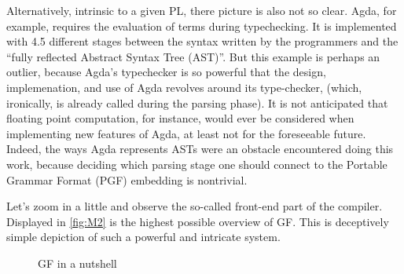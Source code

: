 Alternatively, intrinsic to a given PL, there picture is also not so clear.
Agda, for example, requires the evaluation of terms during typechecking. It is
implemented with 4.5 different stages between the syntax written by the
programmers and the ``fully reflected Abstract Syntax Tree (AST)''. But this
example is perhaps an outlier, because Agda's typechecker is so powerful that
the design, implemenation, and use of Agda revolves around its type-checker,
(which, ironically, is already called during the parsing phase). It is not
anticipated that floating point computation, for instance, would ever be
considered when implementing new features of Agda, at least not for the
foreseeable future. Indeed, the ways Agda represents ASTs were an obstacle
encountered doing this work, because deciding which parsing stage one should connect
to the Portable Grammar Format (PGF) embedding is nontrivial.



Let's zoom in a little and observe the so-called front-end part of the compiler.
Displayed in \autoref{fig:M2} is the highest possible overview of GF. This is
deceptively simple depiction of such a powerful and intricate system.

\begin{figure}
\centering
{}
\caption{GF in a nutshell} \label{fig:M2}
\end{figure}

